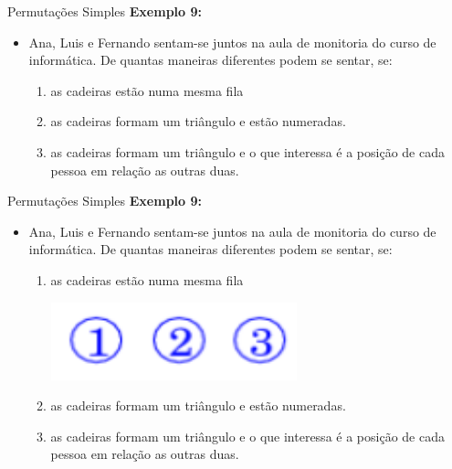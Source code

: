 \documentclass[aspectratio=169]{beamer}
\begin{document}
\begin{frame}{Permutações Simples}
    \textbf{Exemplo 9:}

    \vspace{2mm}

    \begin{itemize}
        \item[] Ana, Luis e Fernando sentam-se juntos na aula de monitoria do curso de informática. De quantas maneiras diferentes podem se sentar, se:
        \begin{enumerate}[(1)]
            \item as cadeiras estão numa mesma fila
            \item as cadeiras formam um triângulo e estão numeradas.
            \item as cadeiras formam um triângulo e o que interessa é a posição de cada pessoa em relação as outras duas.
        \end{enumerate}
    \end{itemize}
\end{frame}

\begin{frame}{Permutações Simples}
    \textbf{Exemplo 9:}

    \vspace{2mm}

    \begin{itemize}
        \item[] Ana, Luis e Fernando sentam-se juntos na aula de monitoria do curso de informática. De quantas maneiras diferentes podem se sentar, se:
        \begin{enumerate}[(1)]
            \item as cadeiras estão numa mesma fila
            \begin{center}
                \includegraphics[width=0.2\linewidth]{figs/Exemplo9_1.png}
            \end{center}
            \item as cadeiras formam um triângulo e estão numeradas.
            \item as cadeiras formam um triângulo e o que interessa é a posição de cada pessoa em relação as outras duas.
        \end{enumerate}
    \end{itemize}
\end{frame}
\end{document}
